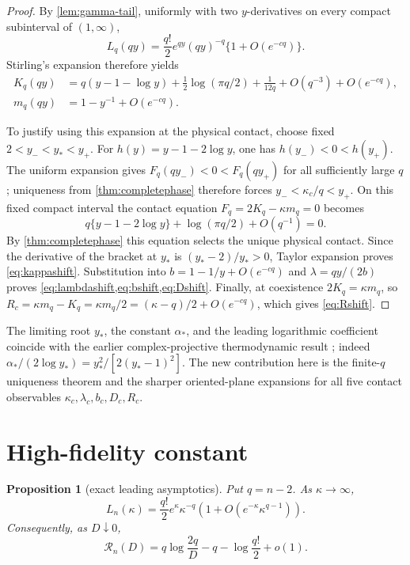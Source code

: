 \documentclass[11pt,a4paper]{article}
\newtheorem{proposition}[theorem]{Proposition}
\newcommand{\RDF}{\mathcal R}
\begin{document}
\begin{proof}
By \cref{lem:gamma-tail}, uniformly with two $y$-derivatives on every compact
subinterval of $(1,\infty)$,
\begin{equation}\label{eq:gammalaplace}
 L_q(qy)=\frac{q!}{2}e^{qy}(qy)^{-q}
 \{1+O(e^{-c q})\}.
\end{equation}
Stirling's expansion therefore yields
\begin{align}
 K_q(qy)
 &=q(y-1-\log y)+\tfrac12\log(\pi q/2)
   +\frac1{12q}+O(q^{-3})+O(e^{-cq}),\label{eq:Klaplace}\\
 m_q(qy)&=1-y^{-1}+O(e^{-cq}).\label{eq:mlaplace}
\end{align}

To justify using this expansion at the physical contact, choose fixed
$2<y_-<y_*<y_+$.  For $h(y)=y-1-2\log y$, one has
$h(y_-)<0<h(y_+)$.  The uniform expansion gives
$F_q(qy_-)<0<F_q(qy_+)$ for all sufficiently large $q$; uniqueness from
\cref{thm:completephase} therefore forces
$y_-<\kappa_c/q<y_+$.  On this fixed compact interval the contact equation
$F_q=2K_q-\kappa m_q=0$ becomes
\[
 q\{y-1-2\log y\}+\log(\pi q/2)+O(q^{-1})=0.
\]
By \cref{thm:completephase} this equation selects the unique physical
contact.  Since the derivative of the bracket at $y_*$ is
$(y_*-2)/y_*>0$, Taylor expansion proves \cref{eq:kappashift}.
Substitution into $b=1-1/y+O(e^{-cq})$ and
$\lambda=qy/(2b)$ proves \cref{eq:lambdashift,eq:bshift,eq:Dshift}.
Finally, at coexistence $2K_q=\kappa m_q$, so
$R_c=\kappa m_q-K_q=\kappa m_q/2=(\kappa-q)/2+O(e^{-cq})$,
which gives \cref{eq:Rshift}.
\end{proof}

The limiting root $y_*$, the constant $\alpha_*$, and the leading logarithmic
coefficient coincide with the earlier complex-projective thermodynamic result
\cite{Eriksson2026ProjectiveThermodynamic}; indeed
$\alpha_*/(2\log y_*)=y_*^2/[2(y_*-1)^2]$.  The new contribution here is the
finite-$q$ uniqueness theorem and the sharper oriented-plane expansions for
all five contact observables $\kappa_c,\lambda_c,b_c,D_c,R_c$.

\section{High-fidelity constant}

\begin{proposition}[exact leading asymptotics]\label{prop:highrate}
Put $q=n-2$.  As $\kappa\to\infty$,
\begin{equation}\label{eq:Lasymp}
 L_n(\kappa)=\frac{q!}{2}e^\kappa\kappa^{-q}
 \left(1+O(e^{-\kappa}\kappa^{q-1})\right).
\end{equation}
Consequently, as $D\downarrow0$,
\begin{equation}\label{eq:Rasymp}
 \boxed{
 \RDF_n(D)=q\log\frac{2q}{D}-q-\log\frac{q!}{2}+o(1).}
\end{equation}
\end{proposition}
\end{document}
